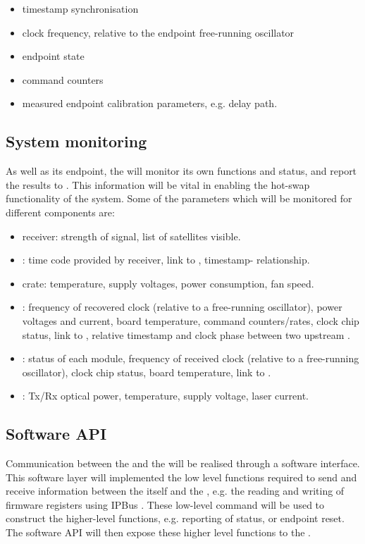 \documentclass[main.tex]{subfiles}
\begin{document}
\begin{itemize}
  \item timestamp synchronisation
  \item clock frequency, relative to the endpoint free-running oscillator
  \item endpoint state
  \item command counters
  \item measured endpoint calibration parameters, e.g. delay path.
\end{itemize}

\subsection{System monitoring}
As well as its endpoint, the  will monitor its own functions and status, and report the results to . This information will be vital in enabling the hot-swap functionality of the system. Some of the parameters which will be monitored for different  components are:

\begin{itemize}
    \item {} receiver: strength of signal, list of satellites visible. 
    \item {}: time code provided by  receiver, link to ,  timestamp- relationship.
    \item {} crate: temperature, supply voltages, power consumption, fan speed.
    \item {}: frequency of recovered clock (relative to a free-running oscillator), power voltages and current, board temperature, command counters/rates, clock chip status, link to , relative timestamp and clock phase between two upstream  .
    \item {}: status of each  module, frequency of received clock (relative to a free-running oscillator), clock chip status, board temperature, link to .
    \item {}: Tx/Rx optical power, temperature, supply voltage, laser current.  
\end{itemize}

\subsection{Software API}
Communication between the  and the  will be realised through a software interface. This software layer will implemented the low level functions required to send and receive information between the itself and the , e.g. the reading and writing of  firmware registers using IPBus \cite{ipbus}. These low-level command will be used to construct the higher-level functions, e.g. reporting of  status, or endpoint reset. The software API will then expose these higher level functions to the .
\end{document}
